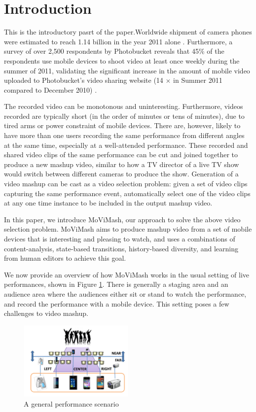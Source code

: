 \documentclass{sig-alternate}
\begin{document}
\section{Introduction}
This is the introductory pasrt of the paper.Worldwide shipment of camera phones were estimated to reach
1.14 billion in the year 2011 alone \cite{1}. Furthermore, a survey of over 2,500 respondents by Photobucket reveals that 45\% of the respondents use mobile devices to shoot video at least once weekly during the summer of 2011, validating the significant increase in the amount of mobile video uploaded to Photobucket's video sharing website (14 $\times$ in Summer 2011 compared to December 2010) \cite{2}.


The recorded video can be monotonous and uninteresting. Furthermore, videos recorded are typically short (in the order of minutes or tens of minutes), due to tired arms or power constraint of mobile devices. There are, however, likely to have more than one users
recording the same performance from different angles at the same
time, especially at a well-attended performance.
These recorded and shared video clips of the same performance
can be cut and joined together to produce a new mashup video, similar to how a TV director of a live TV show would switch between different cameras to produce the show. Generation of a video mashup can be cast as a video selection problem: given a set of video clips capturing the same performance event, automatically select one of the video clips at any one time instance to be included in the output mashup video.

In this paper, we introduce MoViMash, our approach to solve
the above video selection problem. MoViMash aims to produce
mashup video from a set of mobile devices that is interesting and
pleasing to watch, and uses a combinations of content-analysis,
state-based transitions, history-based diversity, and learning from
human editors to achieve this goal.

We now provide an overview of how MoViMash works in the
usual setting of live performances, shown in Figure \ref{fig:fig1}. There is
generally a staging area and an audience area where the audiences either sit or stand to watch the performance, and record the performance with a mobile device. This setting poses a few challenges to video mashup.

\begin{figure}[h]
    \centering
    \includegraphics[width=0.5\textwidth]{img1.png}
    \caption{A general performance scenario}
    \label{fig:fig1}
\end{figure}
\end{document}
